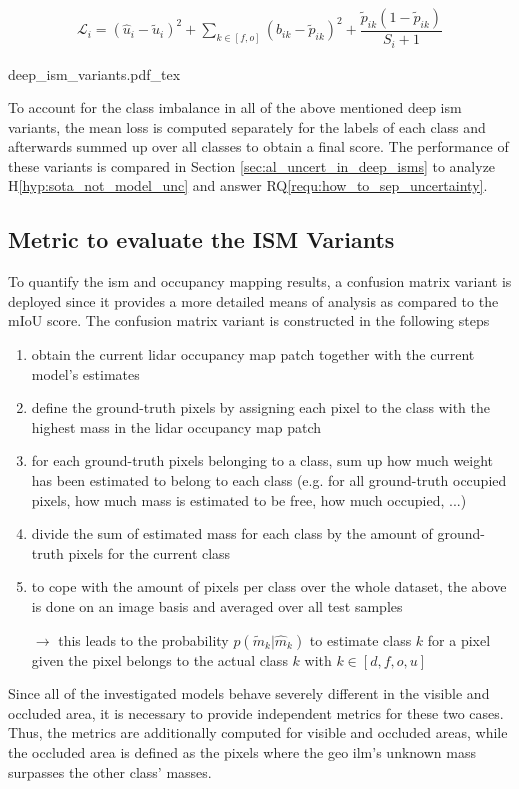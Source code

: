 \begin{align}
	\mathcal{L}_i = (\hat{u}_i-\tilde{u}_{i})^2 + \sum_{k\in [f,o]}(b_{ik}-\tilde{p}_{ik})^2 + \dfrac{\tilde{p}_{ik}(1-\tilde{p}_{ik})}{S_i+1} 
\end{align}
\begin{center}
	{deep_ism_variants.pdf_tex}
\end{center}
To account for the class imbalance in all of the above mentioned deep \gls{ism} variants, the mean loss is computed separately for the labels of each class and afterwards summed up over all classes to obtain a final score. The performance of these variants is compared in Section \ref{sec:al_uncert_in_deep_isms} to analyze H\ref{hyp:sota_not_model_unc} and answer RQ\ref{requ:how_to_sep_uncertainty}.
%
\subsection{Metric to evaluate the ISM Variants}
\label{subsec:confusion_matrix}
To quantify the \gls{ism} and occupancy mapping results, a confusion matrix variant is deployed since it provides a more detailed means of analysis as compared to the mIoU score. The confusion matrix variant is constructed in the following steps  
\begin{enumerate}
	\item obtain the current lidar occupancy map patch together with the current model's estimates
	\item define the ground-truth pixels by assigning each pixel to the class with the highest mass in the lidar occupancy map patch 
	\item for each ground-truth pixels belonging to a class, sum up how much weight has been estimated to belong to each class (e.g. for all ground-truth occupied pixels, how much mass is estimated to be free, how much occupied, ...)
	\item divide the sum of estimated mass for each class by the amount of ground-truth pixels for the current class 
	\item to cope with the amount of pixels per class over the whole dataset, the above is done on an image basis and averaged over all test samples
	\item[$\rightarrow$] this leads to the probability $p(\tilde{m}_k|\hat{m}_k)$ to estimate class $k$ for a pixel given the pixel belongs to the actual class $k$ with $k \in [d, f, o, u]$
\end{enumerate}
Since all of the investigated models behave severely different in the visible and occluded area, it is necessary to provide independent metrics for these two cases. Thus, the metrics are additionally computed for visible and occluded areas, while the occluded area is defined as the pixels where the geo \gls{ilm}'s unknown mass surpasses the other class' masses.
%
